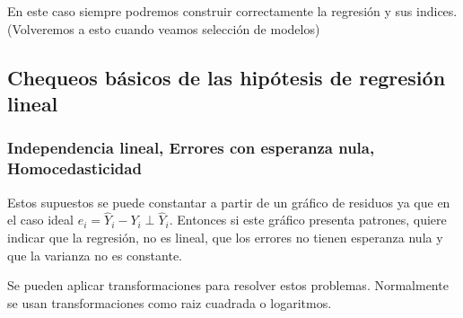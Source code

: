 \documentclass[
  12pt,
]{book}
\providecommand{\tightlist}{%
  \setlength{\itemsep}{0pt}\setlength{\parskip}{0pt}}
\theoremstyle{definition}
\theoremstyle{definition}
\theoremstyle{definition}
\theoremstyle{remark}
\begin{document}
\begin{description}
\tightlist
\item[Más observaciones que predictores]
En este caso siempre podremos construir correctamente la regresión y sus indices. (Volveremos a esto cuando veamos selección de modelos)
\end{description}

\hypertarget{chequeos-buxe1sicos-de-las-hipuxf3tesis-de-regresiuxf3n-lineal}{%
\subsection{Chequeos básicos de las hipótesis de regresión lineal}\label{chequeos-buxe1sicos-de-las-hipuxf3tesis-de-regresiuxf3n-lineal}}

\hypertarget{independencia-lineal-errores-con-esperanza-nula-homocedasticidad}{%
\subsubsection{Independencia lineal, Errores con esperanza nula, Homocedasticidad}\label{independencia-lineal-errores-con-esperanza-nula-homocedasticidad}}

Estos supuestos se puede constantar a partir de un gráfico de residuos ya que en el caso ideal \(e_{i} = \hat{Y}_{i}- Y_{i} \perp \hat{Y}_{i}\). Entonces si este gráfico presenta patrones, quiere indicar que la regresión, no es lineal, que los errores no tienen esperanza nula y que la varianza no es constante.

Se pueden aplicar transformaciones para resolver estos problemas. Normalmente se usan transformaciones como raiz cuadrada o logaritmos.
\end{document}
